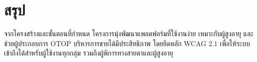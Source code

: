 \section{สรุป}
จากโครงสร้างและขั้นตอนที่กำหนด โครงการมุ่งพัฒนาแพลตฟอร์มที่ใช้งานง่าย \cite{ecommerce2019}
เหมาะกับผู้สูงอายุ และช่วยผู้ประกอบการ OTOP บริหารการขายได้มีประสิทธิภาพ \cite{otop2020}
โดยยึดหลัก WCAG 2.1 เพื่อให้ระบบเข้าถึงได้สำหรับผู้ใช้งานทุกกลุ่ม 
รวมถึงผู้พิการทางสายตาและผู้สูงอายุ
